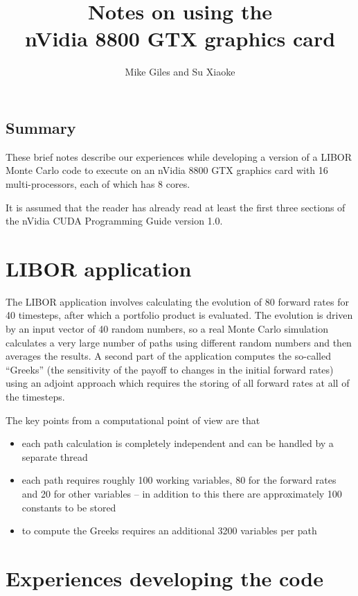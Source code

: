 \documentclass[12pt]{article}
\begin{document}
\title{Notes on using the\\ nVidia 8800 GTX graphics card}
\author{Mike Giles and Su Xiaoke}
\date{}
\maketitle

\subsection*{Summary}

These brief notes describe our experiences while developing a version of 
a LIBOR Monte Carlo code to execute on an nVidia 8800 GTX graphics card 
with 16 multi-processors, each of which has 8 cores.

It is assumed that the reader has already read at least the first three 
sections of the nVidia CUDA Programming Guide version 1.0.


\section{LIBOR application}


The LIBOR application involves calculating the evolution of 80 forward 
rates for 40 timesteps, after which a portfolio product is evaluated.
The evolution is driven by an input vector of 40 random numbers, so 
a real Monte Carlo simulation calculates a very large number of paths
using different random numbers and then averages the results.
A second part of the application computes the so-called ``Greeks''
(the sensitivity of the payoff to changes in the initial forward rates)
using an adjoint approach which requires the storing of all forward 
rates at all of the timesteps. 

The key points from a computational point of view are that
\begin{itemize}
\item
each path calculation is completely independent and can be handled 
by a separate thread
\item
each path requires roughly 100 working variables, 80 for the forward 
rates and 20 for other variables -- in addition to this there are 
approximately 100 constants to be stored
\item
to compute the Greeks requires an additional 3200 variables per path
\end{itemize}

\newpage

\section{Experiences developing the code}
\end{document}
